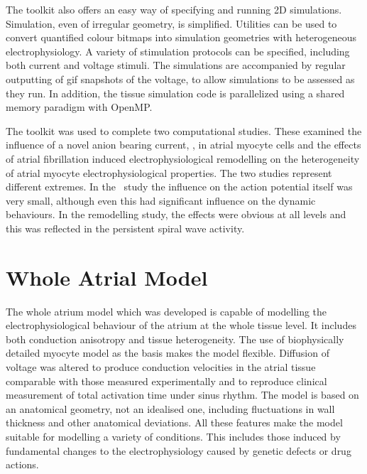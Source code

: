 The toolkit also offers an easy way of specifying and running 2D simulations.
Simulation, even of irregular geometry, is simplified.
Utilities can be used to convert quantified colour bitmaps into simulation
geometries with heterogeneous electrophysiology.
A variety of stimulation protocols can be specified, including both current and
voltage stimuli.
The simulations are accompanied by regular outputting of gif snapshots of the
voltage, to allow simulations to be assessed as they run.
In addition, the tissue simulation code is parallelized using a shared memory
paradigm with OpenMP.

The toolkit was used to complete two computational studies.
These examined the influence of a novel anion bearing current, , in
atrial myocyte cells and the effects of atrial fibrillation induced
electrophysiological remodelling on the heterogeneity of atrial myocyte
electrophysiological properties.
The two studies represent different extremes.
In the \ study the influence on the action potential itself was very
small, although even this had significant influence on the dynamic behaviours.
In the remodelling study, the effects were obvious at all levels and this was
reflected in the persistent spiral wave activity.

\section{Whole Atrial Model}

The whole atrium model which was developed is capable of modelling the
electrophysiological behaviour of the atrium at the whole tissue level.
It includes both conduction anisotropy and tissue heterogeneity.
The use of biophysically detailed myocyte model as the basis makes the model
flexible.
Diffusion of voltage was altered to produce conduction velocities in the atrial
tissue comparable with those measured experimentally and to reproduce clinical
measurement of total activation time under sinus rhythm.
The model is based on an anatomical geometry, not an idealised one, including
fluctuations in wall thickness and other anatomical deviations.
All these features make the model suitable for modelling a variety of conditions.
This includes those induced by fundamental changes to the electrophysiology
caused by genetic defects or drug actions.

